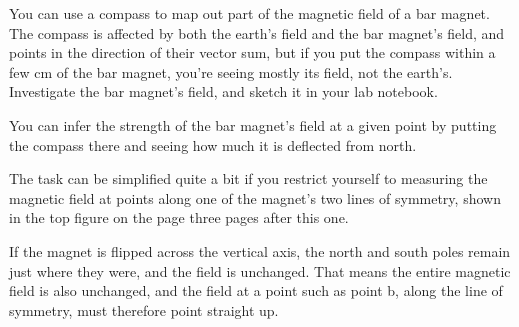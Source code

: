 \label{lab:magnetism}

\label{fig:dipbofr}

\label{fig:dipnew}

\apparatus
{}


\introduction

You can use a compass to map out part of the magnetic
field of a bar magnet. The compass is affected by
both the earth's field and the bar magnet's field, and
points in the direction of their vector sum, but if you put the
compass within a few cm of the bar magnet, you're seeing mostly
its field, not the earth's. Investigate the bar magnet's field,
and sketch it in your lab notebook.

You can infer the strength of the bar magnet's field at a
given point by putting the compass there and seeing how
much it is deflected from north.

The task can be simplified quite a bit if you restrict
yourself to measuring the magnetic field at points along one
of the magnet's two lines of symmetry, shown in the top figure on the
page three pages after this one.


If the magnet is flipped across the vertical axis, the north
and south poles remain just where they were, and the field
is unchanged. That means the entire magnetic field is also
unchanged, and the field at a point such as point b, along
the line of symmetry, must therefore point straight up.

